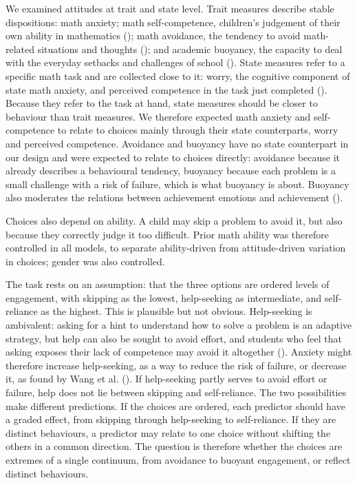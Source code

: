 \documentclass[
  man,
  floatsintext,
  longtable,
  nolmodern,
  notxfonts,
  notimes,
  colorlinks=true,linkcolor=blue,citecolor=blue,urlcolor=blue]{apa7}
\begin{document}
We examined attitudes at trait and state level. Trait measures describe
stable dispositions: math anxiety; math self-competence, children's
judgement of their own ability in mathematics
(); math avoidance, the tendency
to avoid math-related situations and thoughts
(); and academic buoyancy,
the capacity to deal with the everyday setbacks and challenges of school
(). State measures refer
to a specific math task and are collected close to it: worry, the
cognitive component of state math anxiety, and perceived competence in
the task just completed (). Because they refer to the task at hand, state measures
should be closer to behaviour than trait measures. We therefore expected
math anxiety and self-competence to relate to choices mainly through
their state counterparts, worry and perceived competence. Avoidance and
buoyancy have no state counterpart in our design and were expected to
relate to choices directly: avoidance because it already describes a
behavioural tendency, buoyancy because each problem is a small challenge
with a risk of failure, which is what buoyancy is about. Buoyancy also
moderates the relations between achievement emotions and achievement
().

Choices also depend on ability. A child may skip a problem to avoid it,
but also because they correctly judge it too difficult. Prior math
ability was therefore controlled in all models, to separate
ability-driven from attitude-driven variation in choices; gender was
also controlled.

The task rests on an assumption: that the three options are ordered
levels of engagement, with skipping as the lowest, help-seeking as
intermediate, and self-reliance as the highest. This is plausible but
not obvious. Help-seeking is ambivalent: asking for a hint to understand
how to solve a problem is an adaptive strategy, but help can also be
sought to avoid effort, and students who feel that asking exposes their
lack of competence may avoid it altogether (). Anxiety might therefore increase help-seeking, as a way
to reduce the risk of failure, or decrease it, as found by Wang et al.
(). If help-seeking partly serves to avoid
effort or failure, help does not lie between skipping and self-reliance.
The two possibilities make different predictions. If the choices are
ordered, each predictor should have a graded effect, from skipping
through help-seeking to self-reliance. If they are distinct behaviours,
a predictor may relate to one choice without shifting the others in a
common direction. The question is therefore whether the choices are
extremes of a single continuum, from avoidance to buoyant engagement, or
reflect distinct behaviours.
\end{document}
